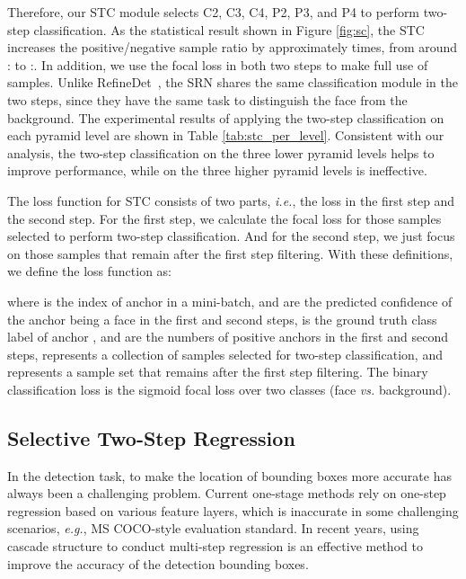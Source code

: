 \documentclass[letterpaper]{article} \usepackage{aaai19m}  \usepackage{times}  \usepackage{helvet}  \usepackage{courier}  \usepackage{url}  \usepackage{graphicx}  \usepackage{subfigure}
\def\ie{{\em i.e.}}
\def\eg{{\em e.g.}}
\begin{document}
Therefore, our STC module selects C2, C3, C4, P2, P3, and P4 to perform two-step classification. As the statistical result shown in Figure \ref{fig:sc}, the STC increases the positive/negative sample ratio by approximately  times, from around : to :. In addition, we use the focal loss in both two steps to make full use of samples. Unlike RefineDet~\cite{DBLP:journals/corr/abs-1711-06897}, the SRN shares the same classification module in the two steps, since they have the same task to distinguish the face from the background. The experimental results of applying the two-step classification on each pyramid level are shown in Table \ref{tab:stc_per_level}. Consistent with our analysis, the two-step classification on the three lower pyramid levels helps to improve performance, while on the three higher pyramid levels is ineffective.

The loss function for STC consists of two parts, \ie, the loss in the first step and the second step. For the first step, we calculate the focal loss for those samples selected to perform two-step classification. And for the second step, we just focus on those samples that remain after the first step filtering. With these definitions, we define the loss function as:

where  is the index of anchor in a mini-batch,  and  are the predicted confidence of the anchor  
being a face in the first and second steps,  is the ground truth class label of anchor ,  and  are the numbers of positive anchors in the first and second steps,  represents a collection of samples selected for two-step classification, and  represents a sample set that remains after the first step filtering. The binary classification loss  is the sigmoid focal loss over two classes (face {\em vs.} background).


\subsection{Selective Two-Step Regression}
In the detection task, to make the location of bounding boxes more accurate has always been a challenging problem. Current one-stage methods rely on one-step regression based on various feature layers, which is inaccurate in some challenging scenarios, \eg, MS COCO-style evaluation standard. In recent years, using cascade structure \cite{DBLP:journals/corr/abs-1711-06897,DBLP:journals/corr/abs-1712-00726} to conduct multi-step regression is an effective method to improve the accuracy of the detection bounding boxes.
\end{document}
